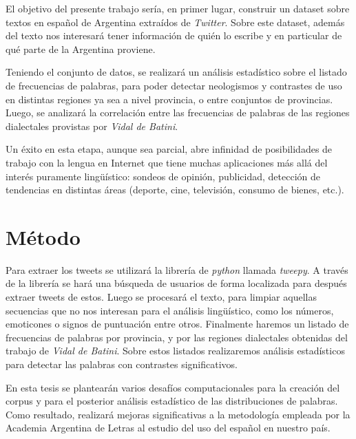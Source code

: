 \documentclass[a4paper,11pt]{article}
\begin{document}
El objetivo del presente trabajo sería, en primer lugar, construir un dataset\cite{CORPLING} sobre textos en español de Argentina extraídos de \emph{Twitter}\cite{KILG2003}. 
Sobre este dataset, además del texto nos interesará tener información de quién lo escribe y en particular de qué parte de la Argentina proviene.

Teniendo el conjunto de datos, se realizará un análisis estadístico sobre el listado de frecuencias de palabras, para poder detectar neologismos y contrastes de uso en distintas regiones ya sea a nivel provincia, o entre conjuntos de provincias. Luego, se analizará la correlación entre las frecuencias de palabras de las regiones dialectales provistas por \emph{Vidal de Batini}\cite{VIDAL1964}.

Un éxito en esta etapa, aunque sea parcial, abre infinidad de posibilidades de trabajo con la lengua en Internet que tiene muchas aplicaciones más allá del interés puramente lingüístico: sondeos de opinión, publicidad, detección de tendencias en distintas áreas (deporte, cine, televisión, consumo de bienes, etc.).   


\section*{Método}

Para extraer los tweets se utilizará la librería de \textit{python} llamada \textit{tweepy}.
A través de la librería se hará una búsqueda de usuarios de forma localizada para después extraer tweets de estos.
Luego se procesará el texto, para limpiar aquellas secuencias que no nos interesan para el análisis lingüístico,
como los números, emoticones o signos de puntuación entre otros.
Finalmente haremos un listado de frecuencias de palabras\cite{BAAYEN} por provincia,
y por las regiones dialectales obtenidas del trabajo de  \emph{Vidal de Batini}. Sobre estos listados realizaremos análisis estadísticos para detectar las palabras con contrastes significativos. 

En esta tesis se plantearán varios desafíos computacionales para la
creación del corpus y para el posterior análisis estadístico de las
distribuciones de palabras. Como resultado, realizará mejoras significativas
a la metodología empleada por la Academia Argentina de Letras al
estudio del uso del español en nuestro país.
\end{document}
